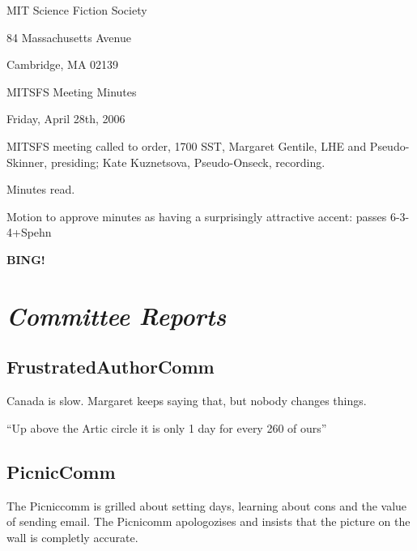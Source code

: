 \documentclass[10pt]{article}
\newcommand{\bing}{{\bf BING!} }
\newcommand{\goto}[1]{\bing \vskip 12pt \section*{{\em{#1}}}}
\begin{document}
\begin{center}

MIT Science Fiction Society

84 Massachusetts Avenue

Cambridge, MA 02139

\vspace{12pt}

MITSFS Meeting Minutes

Friday, April 28th, 2006

\end{center}

\vspace{18pt}

\setlength{\parskip}{6pt}

\noindent
MITSFS meeting called to order, 1700 SST,
Margaret Gentile, LHE  and Pseudo-Skinner, presiding; Kate Kuznetsova, Pseudo-Onseck, recording.

Minutes read.

Motion to approve minutes as having a surprisingly attractive accent: passes 6-3-4+Spehn

\goto{Committee Reports}



\subsection*{FrustratedAuthorComm}

Canada is slow. Margaret keeps saying that, but nobody changes things.

``Up above the Artic circle it is only 1 day for every 260 of ours''

\subsection*{PicnicComm}

The Picniccomm is grilled about setting days, learning about cons and the value of sending email. The Picnicomm apologozises and insists that the picture on the wall is completly accurate.

\end{document}
